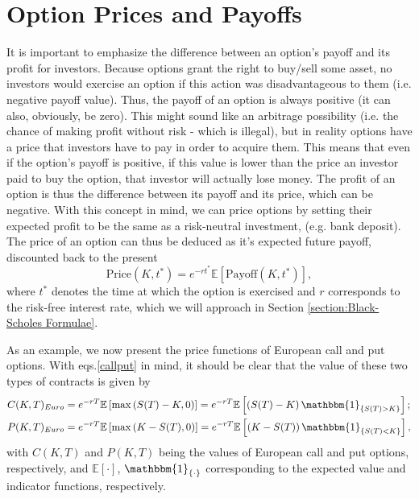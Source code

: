 \section{Option Prices and Payoffs}
It is important to emphasize the difference between an option's payoff and its profit for investors. Because options grant the right to buy/sell some asset, no investors would exercise an option if this action was disadvantageous to them (i.e. negative payoff value). Thus, the payoff of an option is always positive (it can also, obviously, be zero). This might sound like an arbitrage possibility (i.e. the chance of making profit without risk - which is illegal), but in reality options have a price that investors have to pay in order to acquire them. This means that even if the option's payoff is positive, if this value is lower than the price an investor paid to buy the option, that investor will actually lose money. The profit of an option is thus the difference between its payoff and its price, which can be negative.
With this concept in mind, we can price options by setting their expected profit to be the same as a risk-neutral investment, (e.g. bank deposit). The price of an option can thus be deduced as it's expected future payoff, discounted back to the present
\begin{equation}
\text{Price}(K,t^*)=e^{-rt^*}\mathbb{E}\left[\text{Payoff}(K,t^*)\right],
\end{equation}
\noindent where $t^*$ denotes the time at which the option is exercised and $r$ corresponds to the risk-free interest rate, which we will approach in Section \ref{section:Black-Scholes Formulae}.



As an example, we now present the price functions of European call and put options.
With eqs.\eqref{callput} in mind, it should be clear that the value of these two types of contracts is given by
\begin{equation}\label{callprice}
\begin{split}
&C(K,T)_{Euro}=e^{-rT}\mathbb{E}\left[\max\left(S(T)-K,0\right)\right]=e^{-rT}\mathbb{E}\left[\left(S(T)-K\right)\mathbbm{1}_{\left\{S(T)>K\right\}}\right];\\
&P(K,T)_{Euro}=e^{-rT}\mathbb{E}\left[\max\left(K-S(T),0\right)\right]=e^{-rT}\mathbb{E}\left[\left(K-S(T)\right)\mathbbm{1}_{\left\{S(T)<K\right\}}\right],
\end{split}
\end{equation}
\noindent with $C(K,T)$ and $P(K,T)$ being the values of European call and put options, respectively, and $\mathbb{E}[\cdot]$, $\mathbbm{1}_{\{\cdot\}}$ corresponding to the expected value and indicator functions, respectively.

